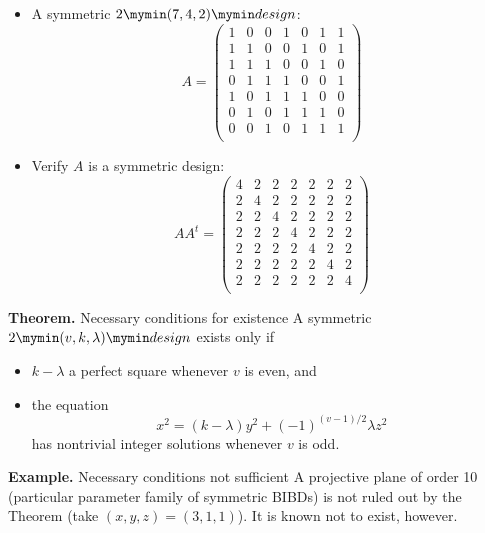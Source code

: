 \documentclass{beamer}
\newcommand{\bibd}[1]{2 \mymin #1 \mymin design}
\begin{document}
\begin{frame}

  \begin{itemize}
  \item A symmetric $\bibd{(7,4,2)}$:
    \[
      A=
      \left(
      \begin{array}{ccccccc}
        1&0&0&1&0&1&1\\
        1&1&0&0&1&0&1\\
        1&1&1&0&0&1&0\\
        0&1&1&1&0&0&1\\
        1&0&1&1&1&0&0\\
        0&1&0&1&1&1&0\\
        0&0&1&0&1&1&1\\
      \end{array}
      \right)
    \]
  \end{itemize}
  
\end{frame}

\begin{frame}
  \begin{itemize}
  \item Verify $A$ is a symmetric design:
    \[
      AA^t =
      \left(
        \begin{array}{ccccccc}
          4&2&2&2&2&2&2\\
          2&4&2&2&2&2&2\\
          2&2&4&2&2&2&2\\
          2&2&2&4&2&2&2\\
          2&2&2&2&4&2&2\\
          2&2&2&2&2&4&2\\
          2&2&2&2&2&2&4\\
        \end{array}
      \right)
    \]
  \end{itemize}
\end{frame}

\begin{frame}

  \begin{block}{{\bf Theorem.} Necessary conditions for existence}
    A symmetric $\bibd{(v,k,\lambda)}$ exists only if
    \begin{itemize}
    \item $k-\lambda$ a perfect square whenever $v$ is even, and
    \item the equation
      \[
        x^2=(k-\lambda)y^2+(-1)^{(v-1)/2}\lambda z^2
      \]
      has nontrivial integer solutions whenever $v$ is odd.
    \end{itemize}
  \end{block}

  \begin{exampleblock}{{\bf Example.} Necessary conditions not sufficient}
    A projective plane of order 10 (particular parameter family of symmetric
    BIBDs) is not ruled out by the Theorem (take $(x,y,z)=(3,1,1)$). It is known
    not to exist, however. 
  \end{exampleblock}

\end{frame}
\end{document}
